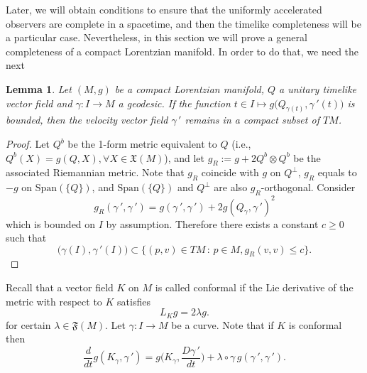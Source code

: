 \documentclass[11pt]{book}
\newtheorem{lem}[defi]{Lemma}
\def\F{\mathfrak F}
\def\x{\mathfrak X}
\begin{document}
Later, we will obtain conditions to ensure that the uniformly accelerated observers are complete in a spacetime, and then the timelike completeness will be a particular case. Nevertheless, in this section we will prove a general completeness of a compact Lorentzian manifold. In order to do that, we need the next
\begin{lem}\label{lem geod}
	Let $(M,g)$ be a compact Lorentzian manifold, $Q$ a unitary timelike vector field and $\gamma:I\to M$ a geodesic. If the function $t\in I \mapsto g\big(Q_{\gamma(t)}, \gamma\,'(t)\big)$ is bounded, then the velocity vector field $\gamma\,'$ remains in a compact subset of $TM$. 
\end{lem}
\begin{proof}
	Let $Q^b$ be the 1-form metric equivalent to $Q$ (i.e., $Q^b(X)=g(Q,X),\forall X\in \x(M)$), and let $g_R:=g+2Q^b \otimes Q^b$ be the associated Riemannian metric. Note that $g_R$ coincide with $g$ on $Q^\perp$, $g_R$ equals to $-g$ on $\text{Span}(\{Q\})$, and $\text{Span}(\{Q\})$ and $Q^\perp$ are also $g_R$-orthogonal. Consider
	\[
	g_R (\gamma\,' , \gamma\,') = g(\gamma\,' , \gamma\,') + 2g(Q_{\gamma}, \gamma\,')^2 
	\]
	which is bounded on $I$ by assumption. Therefore there exists a constant $c\ge 0$ such that
	\[
	\big(\gamma(I), \gamma\,'(I)\big) \subset \{(p,v)\in TM \, : \, p\in M, g_R(v,v)\le c \}.
	\]
\end{proof}

Recall that a vector field $K$ on $M$ is called conformal if the Lie derivative of the metric with respect to $K$ satisfies
\begin{equation}\label{def conformal}
L_K g= 2\lambda g.
\end{equation}
for certain $\lambda \in \F(M)$.
Let $\gamma:I\to M$ be a curve. Note that if $K$ is conformal then
\begin{equation}\label{conformal}
\frac{d}{dt} g(K_\gamma,\gamma\,')= g\big(K_\gamma, \frac{D\gamma\,'}{dt}\big) + \lambda\circ \gamma \, g(\gamma\,' , \gamma\,').
\end{equation}
\end{document}
